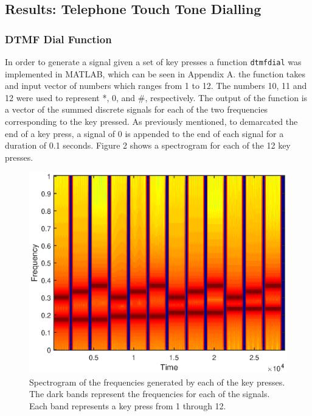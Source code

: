 \documentclass{article}
\begin{document}
\subsection{Results: Telephone Touch Tone Dialling}
\subsubsection{DTMF Dial Function}
In order to generate a signal given a set of key presses a function \verb|dtmfdial| was implemented in MATLAB, which can be seen in Appendix A. the function takes and input vector of numbers which ranges from 1 to 12. The numbers 10, 11 and 12 were used to represent *, 0, and \#, respectively. The output of the function is a vector of the summed discrete signals for each of the two frequencies corresponding to the key pressed. As previously mentioned, to demarcated the end of a key press, a signal of 0 is appended to the end of each signal for a duration of 0.1 seconds. Figure 2 shows a spectrogram for each of the 12 key presses.

\begin{figure}[H]
	\centering
	\includegraphics[scale=0.8]{fig1.eps}
	\caption{Spectrogram of the frequencies generated by each of the key presses. The dark bands represent the frequencies for each of the signals. Each band represents a key press from 1 through 12.}
\end{figure}
\end{document}
